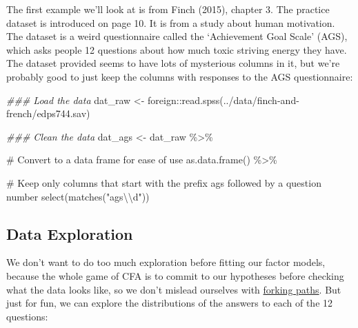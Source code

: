 \documentclass[
  letterpaper,
  DIV=11,
  numbers=noendperiod]{scrreprt}
\newenvironment{Shaded}{\begin{snugshade}}{\end{snugshade}}
\newcommand{\CommentTok}[1]{\textcolor[rgb]{0.37,0.37,0.37}{#1}}
\newcommand{\DocumentationTok}[1]{\textcolor[rgb]{0.37,0.37,0.37}{\textit{#1}}}
\newcommand{\FunctionTok}[1]{\textcolor[rgb]{0.28,0.35,0.67}{#1}}
\newcommand{\NormalTok}[1]{\textcolor[rgb]{0.00,0.23,0.31}{#1}}
\newcommand{\OtherTok}[1]{\textcolor[rgb]{0.00,0.23,0.31}{#1}}
\newcommand{\SpecialCharTok}[1]{\textcolor[rgb]{0.37,0.37,0.37}{#1}}
\newcommand{\StringTok}[1]{\textcolor[rgb]{0.13,0.47,0.30}{#1}}
\begin{document}
The first example we'll look at is from Finch (2015), chapter 3. The
practice dataset is introduced on page 10. It is from a study about
human motivation. The dataset is a weird questionnaire called the
`Achievement Goal Scale' (AGS), which asks people 12 questions about how
much toxic striving energy they have. The dataset provided seems to have
lots of mysterious columns in it, but we're probably good to just keep
the columns with responses to the AGS questionnaire:

\begin{Shaded}
\begin{Highlighting}[]
\DocumentationTok{\#\#\# Load the data}
\NormalTok{dat\_raw }\OtherTok{\textless{}{-}}\NormalTok{ foreign}\SpecialCharTok{::}\FunctionTok{read.spss}\NormalTok{(}\StringTok{\textquotesingle{}../data/finch{-}and{-}french/edps744.sav\textquotesingle{}}\NormalTok{) }
  
\DocumentationTok{\#\#\# Clean the data}
\NormalTok{dat\_ags }\OtherTok{\textless{}{-}}\NormalTok{ dat\_raw }\SpecialCharTok{\%\textgreater{}\%} 

  \CommentTok{\# Convert to a data frame for ease of use}
  \FunctionTok{as.data.frame}\NormalTok{() }\SpecialCharTok{\%\textgreater{}\%} 
  
  \CommentTok{\# Keep only columns that start with the prefix \textquotesingle{}ags\textquotesingle{} followed by a question number}
  \FunctionTok{select}\NormalTok{(}\FunctionTok{matches}\NormalTok{(}\StringTok{"ags}\SpecialCharTok{\textbackslash{}\textbackslash{}}\StringTok{d"}\NormalTok{)) }
\end{Highlighting}
\end{Shaded}

\hypertarget{data-exploration}{%
\subsection*{Data Exploration}\label{data-exploration}}

We don't want to do too much exploration before fitting our factor
models, because the whole game of CFA is to commit to our hypotheses
before checking what the data looks like, so we don't mislead ourselves
with
\href{http://www.stat.columbia.edu/~gelman/research/unpublished/p_hacking.pdf}{forking
paths}. But just for fun, we can explore the distributions of the
answers to each of the 12 questions:
\end{document}
